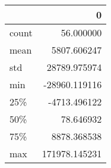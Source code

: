 \begin{tabular}{lr}
\toprule
{} &              0 \\
\midrule
count &      56.000000 \\
mean  &    5807.606247 \\
std   &   28789.975974 \\
min   &  -28960.119116 \\
25\%   &   -4713.496122 \\
50\%   &      78.646932 \\
75\%   &    8878.368538 \\
max   &  171978.145231 \\
\bottomrule
\end{tabular}
